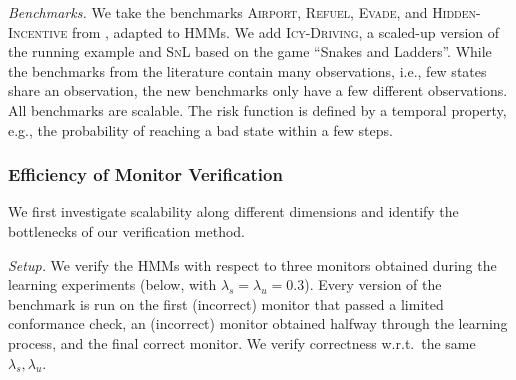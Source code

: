 \documentclass[runningheads]{llncs}
\newcommand{\sj}[2][]{\todo[color=red!50!white,#1]{\footnotesize{SJ: #2}}}
\renewcommand{\paragraph}[1]{\smallskip\noindent\emph{#1}}
\newcommand{\alg}{ToVer\xspace}
\begin{document}
\paragraph{Benchmarks.}
We take the benchmarks \textsc{Airport}, \textsc{Refuel}, \textsc{Evade}, and \textsc{Hidden-Incentive} from \cite{jungesRuntimeMonitorsMarkov2021}, adapted to HMMs. We add \textsc{Icy-Driving}, a scaled-up version of the running example and \textsc{SnL} based on the game ``Snakes and Ladders''.
While the benchmarks from the literature contain many observations, i.e., few states share an observation, the new benchmarks only have a few different observations. All benchmarks are scalable. The risk function is defined by a temporal property, e.g., the probability of reaching a bad state within a few steps.

\subsubsection{Efficiency of Monitor Verification}
We first investigate scalability along different dimensions and identify the bottlenecks of our verification method.

\paragraph{Setup.}
We verify the HMMs with respect to three monitors obtained during the learning experiments (below, with $\lambda_s = \lambda_u = 0.3$). Every version of the benchmark is run on the first (incorrect) monitor that passed a limited conformance check, an (incorrect) monitor obtained halfway through the learning process, and the final correct monitor.
We verify correctness w.r.t.\ the same $\lambda_s, \lambda_u$.


\end{document}
